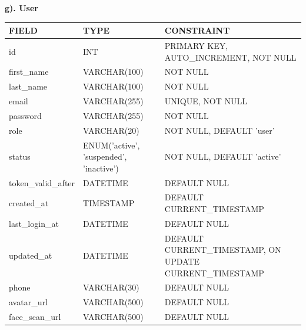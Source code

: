 \vspace{0.4cm}
\clearpage
\noindent\textbf{g). User}
\vspace{0.2cm}
\begin{center}
    \renewcommand{\arraystretch}{1.3}
    \begin{tabular}{|>{\raggedright\arraybackslash}p{3.0cm}|>{\raggedright\arraybackslash}p{4.5cm}|>{\raggedright\arraybackslash}p{8.5cm}|}
        \hline
        \rowcolor{lightgray!50}
        \textbf{FIELD}      & \textbf{TYPE}                           & \textbf{CONSTRAINT}                                      \\ \hline
        id                  & INT                                     & PRIMARY KEY, AUTO\_INCREMENT, NOT NULL                   \\ \hline
        first\_name         & VARCHAR(100)                            & NOT NULL                                                 \\ \hline
        last\_name          & VARCHAR(100)                            & NOT NULL                                                 \\ \hline
        email               & VARCHAR(255)                            & UNIQUE, NOT NULL                                         \\ \hline
        password            & VARCHAR(255)                            & NOT NULL                                                 \\ \hline
        role                & VARCHAR(20)                             & NOT NULL, DEFAULT 'user'                                 \\ \hline
        status              & ENUM('active', 'suspended', 'inactive') & NOT NULL, DEFAULT 'active'                               \\ \hline
        token\_valid\_after & DATETIME                                & DEFAULT NULL                                             \\ \hline
        created\_at         & TIMESTAMP                               & DEFAULT CURRENT\_TIMESTAMP                               \\ \hline
        last\_login\_at     & DATETIME                                & DEFAULT NULL                                             \\ \hline
        updated\_at         & DATETIME                                & DEFAULT CURRENT\_TIMESTAMP, ON UPDATE CURRENT\_TIMESTAMP \\ \hline
        phone               & VARCHAR(30)                             & DEFAULT NULL                                             \\ \hline
        avatar\_url         & VARCHAR(500)                            & DEFAULT NULL                                             \\ \hline
        face\_scan\_url     & VARCHAR(500)                            & DEFAULT NULL                                             \\ \hline
    \end{tabular}
\end{center}

